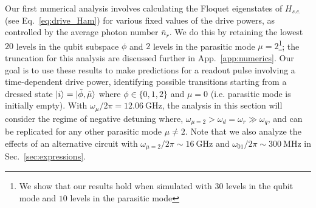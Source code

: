 \documentclass[%
reprint,
superscriptaddress,
 amsmath,amssymb,
 aps,
 prx,
longbibliography,
floatfix,
]{revtex4-2}
\begin{document}
Our first numerical analysis involves calculating the Floquet eigenstates of $H_{s.c.}$ (see Eq.~\ref{eq:drive_Ham}) for various fixed values of the drive powers, as controlled by the average photon number $\bar n_r$.  We do this by retaining the lowest $20$ levels in the qubit subspace $\phi$ and $2$ levels in the parasitic mode $\mu=2$\footnote{We show that our results hold when simulated with $30$ levels in the qubit mode and $10$ levels in the parasitic mode}; the truncation for this analysis are discussed further in App.~\ref{app:numerics}.
Our goal is to use these results to make predictions for a readout pulse involving a time-dependent drive power, identifying possible transitions starting from a dressed state $\ket{i} =\ket{\tilde{\phi}, \tilde{\mu}}$ where $\phi\in\{0,1,2\}$ and $\mu=0$ (i.e. parasitic mode is initially empty). With $\omega_\mu/2\pi=12.06 \ \mathrm{GHz}$, the analysis in this section will consider the regime of negative detuning where, $\omega_{\mu=2}>\omega_d=\omega_r \gg \omega_q$, and can be replicated for any other parasitic mode $\mu \neq 2$. Note that we also analyze the effects of an alternative circuit with $\omega_{\mu=2}/2\pi\sim 16 \ \mathrm{GHz}$ and $\omega_{01}/2\pi\sim 300 \ \mathrm{MHz}$ in Sec.~\ref{sec:expressions}.
\end{document}
